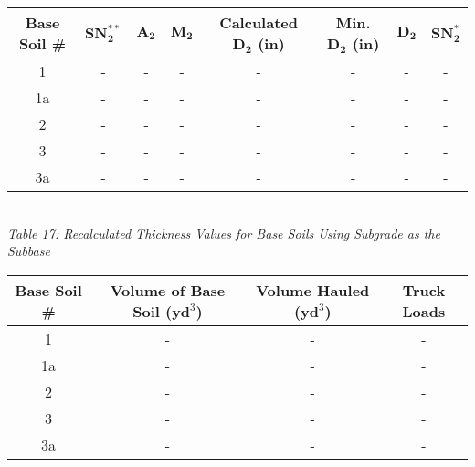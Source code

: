 \documentclass{article}
\begin{document}
\begin{center}
    \begin{tabular}{|c|ccccccc|}
        \hline
        \textbf{Base Soil \#} & $\bm{SN_2^{**}}$ & $\bm{A_2}$ & $\bm{M_2}$ & \textbf{Calculated $\bm{D_2}$ (in)} & \textbf{Min. $\bm{D_2}$ (in)} & $\bm{D_2}$ & $\bm{SN_2^*}$  \\\hline
        1            & -      & - & - & -                   & -             & - & -      \\
        1a           & -      & -  & -  & -                    & -              & -  & -      \\
        2            & -      & -  & -  & -                    & -              & -  & -      \\
        3            & -      & -  & -  & -                    & -              & -  & -      \\
        3a           & -      & - & - & -                   & -             & - & -     \\\hline
    \end{tabular}
    \vspace{3mm}
    \emph{\\Table 17: Recalculated Thickness Values for Base Soils Using Subgrade as the Subbase\\}
    \vspace{7mm}
    \begin{tabular}{|c|ccc|}
        \hline
        \textbf{Base Soil \#} & \textbf{Volume of Base Soil ($\textbf{yd}^3$)} & \textbf{Volume Hauled ($\textbf{yd}^3$)} & \textbf{Truck Loads}  \\\hline
        1              & -                             & -                      & -           \\
        1a             & -                            & -                       & -           \\
        2              & -                            & -                       & -           \\
        3              & -                            & -                       & -           \\
        3a             & -                            & -                      & -            \\\hline
    \end{tabular}
    \vspace{3mm}

\end{center}
\end{document}
